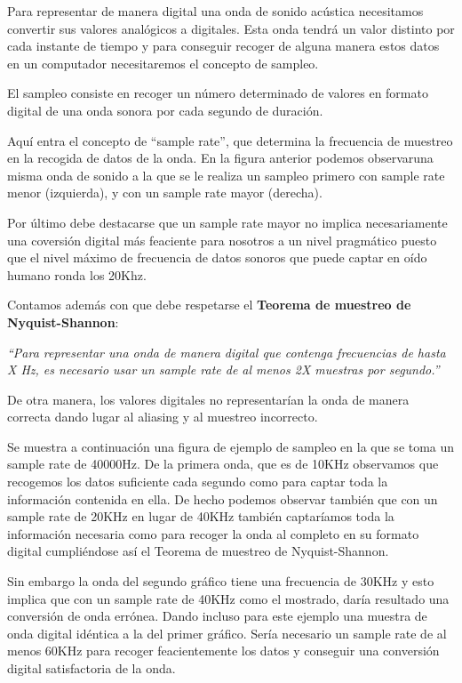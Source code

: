 Para representar de manera digital una onda de sonido acústica necesitamos convertir sus valores analógicos a digitales. Esta onda tendrá un valor distinto por cada instante de tiempo y para conseguir recoger de alguna manera estos datos en un computador necesitaremos el concepto de sampleo.

El sampleo consiste en recoger un número determinado de valores en formato digital de una onda sonora por cada segundo de duración.


Aquí entra el concepto de ``sample rate'', que determina la frecuencia de muestreo en la recogida de datos de la onda. En la figura anterior podemos observaruna misma onda de sonido a la que se le realiza un sampleo primero con sample rate menor (izquierda), y con un sample rate mayor (derecha).

Por último debe destacarse que un sample rate mayor no implica necesariamente una coversión digital más feaciente para nosotros a un nivel pragmático puesto que el nivel máximo de frecuencia de datos sonoros que puede captar en oído humano ronda los 20Khz. 

Contamos además con que debe respetarse el \textbf{Teorema de muestreo de Nyquist-Shannon}:\bigskip

\textsl{``Para representar una onda de manera digital que contenga frecuencias de hasta X Hz, es necesario usar un sample rate de al menos 2X muestras por segundo.''}\bigskip

De otra manera, los valores digitales no representarían la onda de manera correcta dando lugar al aliasing y al muestreo incorrecto.

Se muestra a continuación una figura de ejemplo de sampleo en la que se toma un sample rate de 40000Hz. De la primera onda, que es de 10KHz observamos que recogemos los datos suficiente cada segundo como para captar toda la información contenida en ella. De hecho podemos observar también que con un sample rate de 20KHz en lugar de 40KHz también captaríamos toda la información necesaria como para recoger la onda al completo en su formato digital cumpliéndose así el Teorema de muestreo de Nyquist-Shannon.

Sin embargo la onda del segundo gráfico tiene una frecuencia de 30KHz y esto implica que con un sample rate de 40KHz como el mostrado, daría resultado una conversión de onda errónea. Dando incluso para este ejemplo una muestra de onda digital idéntica a la del primer gráfico. Sería necesario un sample rate de al menos 60KHz para recoger feacientemente los datos y conseguir una conversión digital satisfactoria de la onda.\pagebreak

